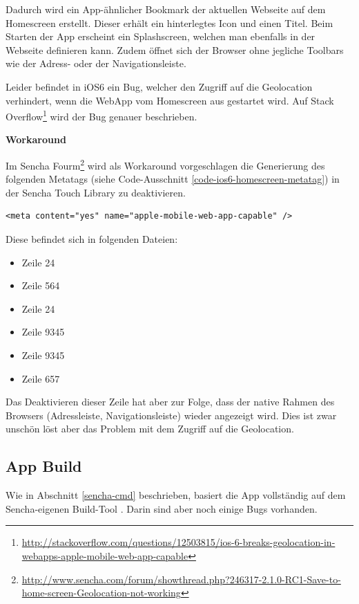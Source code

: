 Dadurch wird ein App-ähnlicher Bookmark der aktuellen Webseite auf dem Homescreen erstellt.
Dieser erhält ein hinterlegtes Icon und einen Titel.
Beim Starten der App erscheint ein Splashscreen, welchen man ebenfalls in der Webseite definieren kann.
Zudem öffnet sich der Browser ohne jegliche Toolbars wie der Adress- oder der Navigationsleiste.

Leider befindet in iOS6 ein Bug, welcher den Zugriff auf die Geolocation verhindert, wenn die \gls{WebApp} vom Homescreen aus gestartet wird.
Auf Stack Overflow\footnote{\url{http://stackoverflow.com/questions/12503815/ios-6-breaks-geolocation-in-webapps-apple-mobile-web-app-capable}} wird der Bug genauer beschrieben.

\textbf{Workaround}

Im Sencha Fourm\footnote{\url{http://www.sencha.com/forum/showthread.php?246317-2.1.0-RC1-Save-to-home-screen-Geolocation-not-working}} wird als Workaround vorgeschlagen die Generierung des folgenden Metatags (siehe Code-Ausschnitt \ref{code-ios6-homescreen-metatag}) in der Sencha Touch Library zu deaktivieren.

\lstset{language=HTML}
\begin{lstlisting}[caption=Metatag für iOS6 Workaround, label=code-ios6-homescreen-metatag]
<meta content="yes" name="apple-mobile-web-app-capable" />
\end{lstlisting}

Diese befindet sich in folgenden Dateien:

\begin{itemize}
\item {} Zeile 24
\item {} Zeile 564
\item {} Zeile 24
\item {} Zeile 9345
\item {} Zeile 9345
\item {} Zeile 657
\end{itemize}

Das Deaktivieren dieser Zeile hat aber zur Folge, dass der native Rahmen des Browsers (Adressleiste, Navigationsleiste) wieder angezeigt wird.
Dies ist zwar unschön löst aber das Problem mit dem Zugriff auf die Geolocation.

\subsection{App Build}
Wie in Abschnitt \ref{sencha-cmd} beschrieben, basiert die App vollständig auf dem Sencha-eigenen Build-Tool . Darin sind aber noch einige Bugs vorhanden.

